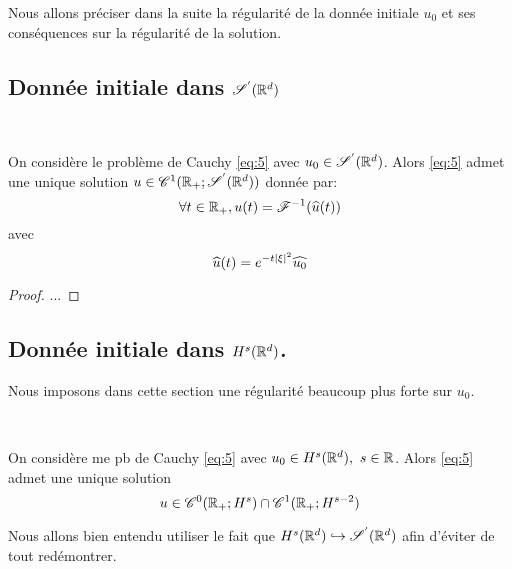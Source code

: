 \documentclass[french,a4paper,10pt]{article}
\begin{document}
        Nous allons préciser dans la suite la régularité de la donnée initiale $u_0$ et ses conséquences sur la régularité de la solution.\\[2mm]

        \subsection{Donnée initiale dans $\mathscr{S}^{'}(\mathbb{R}^d)$}\label{subsec:3.1} 
            \begin{theorem}\label{thm:3.1.1}~
            
                On considère le problème de Cauchy \eqref{eq:5} avec $u_0 \in \mathscr{S}^{'}(\mathbb{R}^d)$.
                Alors \eqref{eq:5} admet une unique solution $u \in \mathscr{C}^1(\mathbb{R}_+;\mathscr{S}^{'}(\mathbb{R}^d))$ donnée par:
                \begin{equation*}
                    \forall t \in \mathbb{R}_+, u(t) = \mathscr{F}^{-1}(\widehat{u}(t))
                \end{equation*}
                avec
                \begin{equation*}
                    \widehat{u}(t) = e^{-t\mathopen{}\left|\xi\right|\mathclose{}^2}\widehat{u_0}
                \end{equation*}
            \end{theorem}

            \begin{proof}
                ...
            \end{proof}

        \subsection{Donnée initiale dans $H^s(\mathbb{R}^d)$.}\label{subsec:3.2}
            Nous imposons dans cette section une régularité beaucoup plus forte sur $u_0$.

            \begin{theorem} \label{thm:3.2.1}~
            
                On considère me pb de Cauchy \eqref{eq:5} avec $u_0 \in H^s(\mathbb{R}^d), \ s \in \mathbb{R}$. Alors \eqref{eq:5} admet une unique solution 
                \begin{equation*}
                    u \in \mathscr{C}^0(\mathbb{R}_+;H^s) \cap \mathscr{C}^1(\mathbb{R}_+;H^{s-2})
                \end{equation*}
            \end{theorem}

            \begin{remark}\label{rem:3.2.2}
                Nous allons bien entendu utiliser le fait que $H^s(\mathbb{R}^d) \hookrightarrow \mathscr{S}^{'}(\mathbb{R}^d)$ afin d'éviter de tout redémontrer.
            \end{remark}
\end{document}

